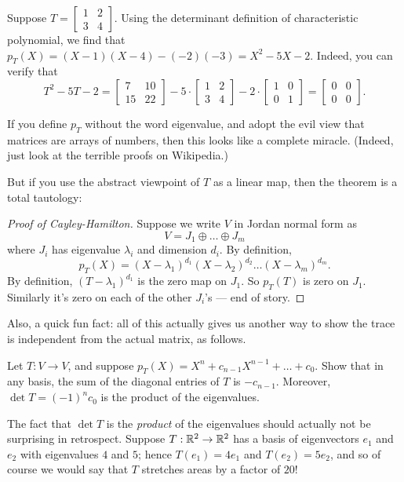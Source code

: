 \begin{example}
	Suppose $T = \begin{bmatrix} 1 & 2 \\ 3 & 4 \end{bmatrix}$.
	Using the determinant definition of characteristic polynomial,
	we find that $p_T(X) = (X-1)(X-4)-(-2)(-3) = X^2 - 5X - 2$.
	Indeed, you can verify that
	\[ T^2 - 5T - 2
		= \begin{bmatrix}
			7 & 10 \\
			15 & 22
		\end{bmatrix}
		- 5 \cdot \begin{bmatrix}
			1 & 2 \\
			3 & 4
		\end{bmatrix}
		- 2 \cdot \begin{bmatrix}
			1 & 0 \\
			0 & 1
		\end{bmatrix}
		= \begin{bmatrix}
			0 & 0 \\
			0 & 0
		\end{bmatrix}.
	\]
\end{example}
If you define $p_T$ without the word eigenvalue,
and adopt the evil view that matrices are arrays of numbers,
then this looks like a complete miracle.
(Indeed, just look at the terrible proofs on Wikipedia.)

But if you use the abstract viewpoint of $T$ as a linear map,
then the theorem is a total tautology:
\begin{proof}[Proof of Cayley-Hamilton]
	Suppose we write $V$ in Jordan normal form as
	\[ V = J_1 \oplus \dots \oplus J_m \]
	where $J_i$ has eigenvalue $\lambda_i$ and dimension $d_i$.
	By definition,
	\[ p_T(X) = (X - \lambda_1)^{d_1} (X - \lambda_2)^{d_2} \dots (X - \lambda_m)^{d_m}. \]
	By definition, $(T - \lambda_1)^{d_1}$ is the zero map on $J_1$.
	So $p_T(T)$ is zero on $J_1$.
	Similarly it's zero on each of the other $J_i$'s --- end of story.
\end{proof}

Also, a quick fun fact: all of this actually gives us another way to show the trace
is independent from the actual matrix, as follows.
\begin{exercise}
	Let $T : V \to V$, and suppose $p_T(X) = X^n + c_{n-1}X^{n-1} + \dots + c_0$.
	Show that in any basis, the sum of the diagonal entries of $T$ is $-c_{n-1}$.
	Moreover, $\det T = (-1)^n c_0$ is the product of the eigenvalues.
\end{exercise}
The fact that $\det T$ is the \emph{product} of the eigenvalues should
actually not be surprising in retrospect.
Suppose $T : \mathbb R^2 \to \mathbb R^2$ has a basis of eigenvectors $e_1$ and $e_2$
with eigenvalues $4$ and $5$; hence $T(e_1) = 4e_1$ and $T(e_2) = 5e_2$,
and so of course we would say that $T$ stretches areas by a factor of $20$!

